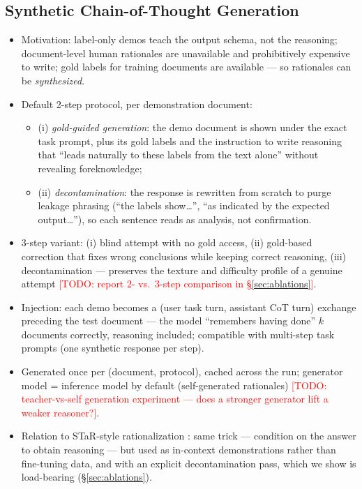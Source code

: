 \documentclass[11pt]{article}
\newcommand{\todo}[1]{\textcolor{red}{[TODO: #1]}}
\begin{document}
\subsection{Synthetic Chain-of-Thought Generation}
\label{sec:synthcot}
\begin{itemize}
  \item Motivation: label-only demos teach the output schema, not the
        reasoning; document-level human rationales are unavailable and
        prohibitively expensive to write; gold labels for training documents
        are available --- so rationales can be \emph{synthesized}.
  \item Default 2-step protocol, per demonstration document:
        \begin{itemize}
          \item (i) \emph{gold-guided generation}: the demo document is shown
                under the exact task prompt, plus its gold labels and the
                instruction to write reasoning that ``leads naturally to these
                labels from the text alone'' without revealing foreknowledge;
          \item (ii) \emph{decontamination}: the response is rewritten from
                scratch to purge leakage phrasing (``the labels show\dots'',
                ``as indicated by the expected output\dots''), so each sentence
                reads as analysis, not confirmation.
        \end{itemize}
  \item 3-step variant: (i) blind attempt with no gold access, (ii) gold-based
        correction that fixes wrong conclusions while keeping correct
        reasoning, (iii) decontamination --- preserves the texture and
        difficulty profile of a genuine attempt \todo{report 2- vs.\ 3-step
        comparison in \S\ref{sec:ablations}}.
  \item Injection: each demo becomes a (user task turn, assistant CoT turn)
        exchange preceding the test document --- the model ``remembers having
        done'' $k$ documents correctly, reasoning included; compatible with
        multi-step task prompts (one synthetic response per step).
  \item Generated once per (document, protocol), cached across the run;
        generator model = inference model by default (self-generated
        rationales) \todo{teacher-vs-self generation experiment --- does a
        stronger generator lift a weaker reasoner?}.
  \item Relation to STaR-style rationalization \citep{zelikman2022star}:
        same trick --- condition on the answer to obtain reasoning --- but used
        as in-context demonstrations rather than fine-tuning data, and with an
        explicit decontamination pass, which we show is load-bearing
        (\S\ref{sec:ablations}).
\end{itemize}
\end{document}
